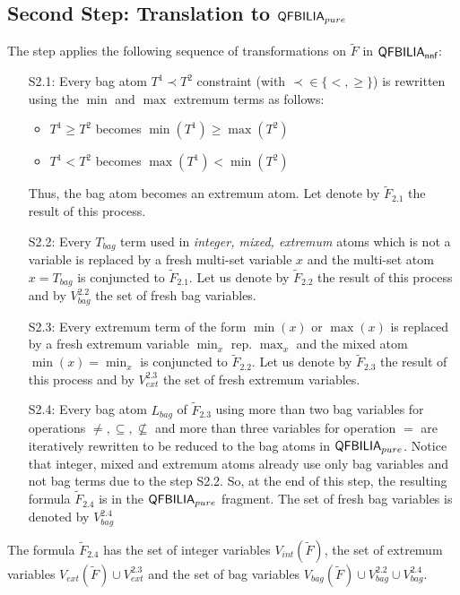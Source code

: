 \subsection{Second Step: Translation to $\textsf{QFBILIA}_{pure}$}
\label{ssec:dp-s2}

The step applies the following sequence of transformations on $\tilde{F}$ in $\textsf{QFBILIA}_{\textsf{nnf}}$:
\begin{enumerate}
\item[S2.1:] Every bag atom $T^1 \prec T^2$ constraint (with $\prec \in \{<,\ge\}$) is rewritten using the $\min$ and $\max$ extremum terms as follows:
\begin{itemize}
\item $T^1 \geq T^2$ becomes $\min(T^1) \geq \max(T^2)$
\item $T^1 <    T^2$ becomes $\max(T^1) < \min(T^2)$
\end{itemize}
Thus, the bag atom becomes an extremum atom.
Let denote by $\tilde{F}_{2.1}$ the result of this process.

\item[S2.2:] Every $T_{bag}$ term used in \emph{integer, mixed, extremum} atoms which is not a variable is replaced by a fresh multi-set variable $x$ and the multi-set atom $x=T_{bag}$ is conjuncted to $\tilde{F}_{2.1}$.
Let us denote by $\tilde{F}_{2.2}$ the result of this process and by $V^{2.2}_{bag}$ the set of fresh bag variables.

\item[S2.3:] Every extremum term of the form $\min(x)$ or $\max(x)$ is replaced by a fresh extremum variable $\min_x$ rep. $\max_x$ and the mixed atom $\min(x) = \min_x$ is conjuncted to $\tilde{F}_{2.2}$.
Let us denote by $\tilde{F}_{2.3}$ the result of this process and by $V^{2.3}_{ext}$ the set of fresh extremum variables.

\item[S2.4:] Every bag atom $L_{bag}$ of $\tilde{F}_{2.3}$ using more than two bag variables for operations $\neq, \subseteq, \nsubseteq$ and more than three variables for operation $=$ are iteratively rewritten to be reduced to the bag atoms in $\textsf{QFBILIA}_{pure}$. Notice that integer, mixed and extremum atoms already use only bag variables and not bag terms due to the step S2.2.
So, at the end of this step, the resulting formula $\tilde{F}_{2.4}$ is in the $\textsf{QFBILIA}_{pure}$ fragment. The set of fresh bag variables is denoted by $V^{2.4}_{bag}$
\end{enumerate}
The formula $\tilde{F}_{2.4}$ has the set of integer variables $V_{int}(\tilde{F})$,
the set of extremum variables $V_{ext}(\tilde{F}) \cup V^{2.3}_{ext}$ and
the set of bag variables $V_{bag}(\tilde{F}) \cup V^{2.2}_{bag} \cup V^{2.4}_{bag}$.

